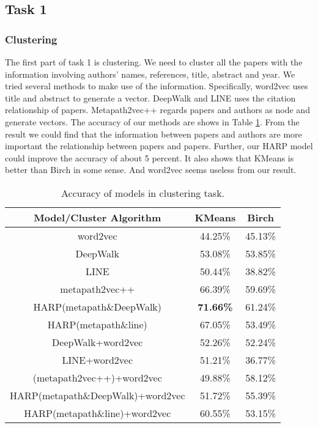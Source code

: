 \documentclass[conference]{IEEEtran}
\begin{document}
\subsection{Task 1}
\subsubsection{Clustering}
The first part of task 1 is clustering. We need to cluster all the papers with the information involving authors' names, references, title, abstract and year. We tried several methods to make use of the information. Specifically, word2vec uses title and abstract to generate a vector. DeepWalk and LINE uses the citation relationship of papers. Metapath2vec++ regards papers and authors as node and generate vectors. The accuracy of our methods are shows in Table \ref{task1cluster}. From the result we could find that the information between papers and authors are more important the relationship between papers and papers. Further, our HARP model could improve the accuracy of about 5 percent. It also shows that KMeans is better than Birch in some sense. And word2vec seems useless from our result.
\begin{table}[h]
\center
	\begin{tabular}{c|c|c}
	\hline
	\hline
	\textbf{Model/Cluster Algorithm}& KMeans & Birch\\
	\hline
	\hline
	word2vec&44.25\%&45.13\%\\
	\hline
	DeepWalk &53.08\%&53.85\%\\
	\hline
	LINE&50.44\%&38.82\%\\
	\hline
	metapath2vec++&66.39\%&59.69\%\\
	\hline
	HARP(metapath\&DeepWalk)&\textbf{71.66\%}&61.24\%\\
	\hline
	HARP(metapath\&line)&67.05\%&53.49\%\\
	\hline
	DeepWalk+word2vec&52.26\%&52.24\%\\
	\hline
	LINE+word2vec&51.21\%&36.77\%\\
	\hline
	(metapath2vec++)+word2vec&49.88\%&58.12\%\\
	\hline
	HARP(metapath\&DeepWalk)+word2vec&51.72\%&55.39\%\\
	\hline
	HARP(metapath\&line)+word2vec&60.55\%&53.15\%\\
	\hline
	\hline
	\end{tabular}	
	\caption{Accuracy of models in clustering task.}
	\label{task1cluster}
\end{table}
\end{document}
